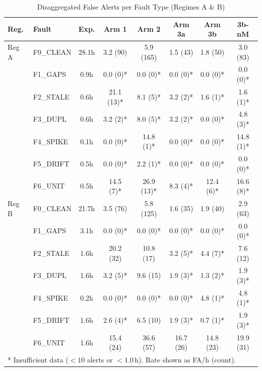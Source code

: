 \begin{table}[htbp]
\caption{Disaggregated False Alerts per Fault Type (Regimes A \& B)}
\label{tab:fault_disaggregated}
\centering
\tiny
\setlength{\tabcolsep}{1.8pt}
\begin{tabular}{|l|l|c|c|c|c|c|c|}
\hline
\textbf{Reg.} & \textbf{Fault} & \textbf{Exp.} & \textbf{Arm 1} & \textbf{Arm 2} & \textbf{Arm 3a} & \textbf{Arm 3b} & \textbf{3b-nM} \\
\hline
Reg A & F0\_CLEAN  & 28.1h & 3.2 (90)  & 5.9 (165) & 1.5 (43)  & 1.8 (50)  & 3.0 (83)  \\
      & F1\_GAPS   &  0.9h & 0.0 (0)*  & 0.0 (0)*  & 0.0 (0)*  & 0.0 (0)*  & 0.0 (0)*  \\
      & F2\_STALE  &  0.6h & 21.1 (13)* & 8.1 (5)*  & 3.2 (2)*  & 1.6 (1)*  & 1.6 (1)*  \\
      & F3\_DUPL   &  0.6h & 3.2 (2)*  & 8.0 (5)*  & 3.2 (2)*  & 0.0 (0)*  & 4.8 (3)*  \\
      & F4\_SPIKE  &  0.1h & 0.0 (0)*  & 14.8 (1)* & 0.0 (0)*  & 0.0 (0)*  & 14.8 (1)* \\
      & F5\_DRIFT  &  0.5h & 0.0 (0)*  & 2.2 (1)*  & 0.0 (0)*  & 0.0 (0)*  & 0.0 (0)*  \\
      & F6\_UNIT   &  0.5h & 14.5 (7)* & 26.9 (13)* & 8.3 (4)*  & 12.4 (6)* & 16.6 (8)* \\
\hline
Reg B & F0\_CLEAN  & 21.7h & 3.5 (76)  & 5.8 (125) & 1.6 (35)  & 1.9 (40)  & 2.9 (63)  \\
      & F1\_GAPS   &  3.1h & 0.0 (0)*  & 0.0 (0)*  & 0.0 (0)*  & 0.0 (0)*  & 0.0 (0)*  \\
      & F2\_STALE  &  1.6h & 20.2 (32) & 10.8 (17) & 3.2 (5)*  & 4.4 (7)*  & 7.6 (12)  \\
      & F3\_DUPL   &  1.6h & 3.2 (5)*  & 9.6 (15)  & 1.9 (3)*  & 1.3 (2)*  & 1.9 (3)*  \\
      & F4\_SPIKE  &  0.2h & 0.0 (0)*  & 0.0 (0)*  & 0.0 (0)*  & 4.8 (1)*  & 4.8 (1)*  \\
      & F5\_DRIFT  &  1.6h & 2.6 (4)*  & 6.5 (10)  & 1.9 (3)*  & 0.7 (1)*  & 1.9 (3)*  \\
      & F6\_UNIT   &  1.6h & 15.4 (24) & 36.6 (57) & 16.7 (26) & 14.8 (23) & 19.9 (31) \\
\hline
\multicolumn{8}{|l|}{* Insufficient data ($<10$ alerts or $<1.0$\,h). Rate shown as FA/h (count).} \\
\hline
\end{tabular}
\end{table}
